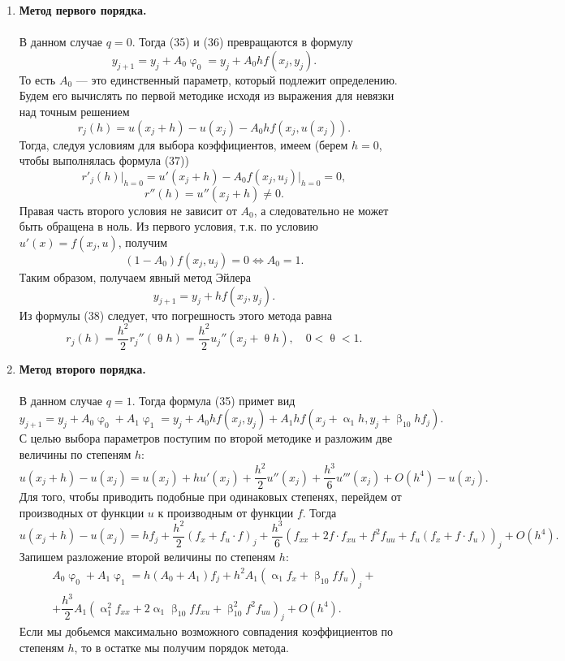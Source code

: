 \documentclass[a4paper, 12pt]{report}
\renewcommand{\alpha}{\upalpha}
\renewcommand{\beta}{\upbeta}
\renewcommand{\varphi}{\upvarphi}
\renewcommand{\theta}{\uptheta}
\begin{document}
	\begin{enumerate}
		\item \textbf{Метод первого порядка.}\\\\
		В данном случае $q = 0$. Тогда (35) и (36) превращаются в формулу
		$$y_{j+1} = y_j + A_0 \varphi_0 = y_j + A_0 h f(x_j, y_j).$$
		То есть $A_0$ --- это единственный параметр, который подлежит определению. Будем его вычислять по первой методике исходя из выражения для невязки над точным решением
		$$r_j(h) = u(x_j + h) - u(x_j) - A_0hf(x_j, u(x_j)).$$
		Тогда, следуя условиям для выбора коэффициентов, имеем (берем $h=0$, чтобы выполнялась формула (37)) 
		$$
		r'_j(h)\Big|_{h=0} = u'(x_j + h) - A_0 f(x_j, u_j)\Big|_{h=0} = 0,$$
		$$
		r''(h) = u''(x_j + h) \ne 0.
		$$
		Правая часть второго условия не зависит от $A_0$, а следовательно не может быть обращена в ноль. Из первого условия, т.к. по условию $u'(x) = f(x_j, u)$, получим
		$$(1-A_0)f(x_j, u_j) = 0 \Longleftrightarrow A_0 = 1.$$
		Таким образом, получаем явный метод Эйлера
		$$y_{j+1} = y_j + h f(x_j, y_j).$$
		Из формулы (38) следует, что погрешность этого метода равна $$r_j(h) = \dfrac{h^2}{2}r_j''(\theta h)=\dfrac{h^2}{2}u_j''(x_j + \theta h),\quad 0<\theta <1.$$
		\item \textbf{Метод второго порядка.}\\\\
		В данном случае $q=1$. Тогда формула (35) примет вид
		$$y_{j+1} = y_j + A_0\varphi_0 + A_1\varphi_1 = y_j + A_0 hf(x_j, y_j) + A_1 hf(x_j + \alpha_1 h, y_j + \beta_{10} hf_j).$$
		С целью выбора параметров поступим по второй методике и разложим две величины по степеням $h$:
		$$u(x_j + h) - u(x_j) = u(x_j) + hu'(x_j) + \dfrac{h^2}{2}u''(x_j)+ \dfrac{h^3}{6}u'''(x_j) + O(h^4) - u(x_j).$$
		Для того, чтобы приводить подобные при одинаковых степенях, перейдем от производных от функции $u$ к производным от функции $f$. Тогда
		$$u(x_j + h) - u(x_j) = hf_j + \dfrac{h^2}{2}\left(f_x + f_u\cdot f\right)_j+ \dfrac{h^3}{6}\left(f_{xx} + 2f\cdot f_{x u}+f^2 f_{uu}+f_u(f_x + f\cdot f_u) \right)_j + O(h^4).$$
		Запишем разложение второй величины по степеням $h$:
		\begin{multline*}
			A_0\varphi_0 + A_1\varphi_1 = h(A_0 + A_1)f_j + h^2A_1(\alpha_1 f_x + \beta_{10} f f_u)_j +\\+ \dfrac{h^3}{2}A_1(\alpha_1^2 f_{xx} + 2\alpha_1 \beta_{10} f f_{xu} + \beta_{10}^2 f^2 f_{uu})_j + O(h^4).
		\end{multline*}
		Если мы добьемся максимально возможного совпадения коэффициентов по степеням $h$, то в остатке мы получим порядок метода.\\\\

\end{enumerate}
\end{document}
